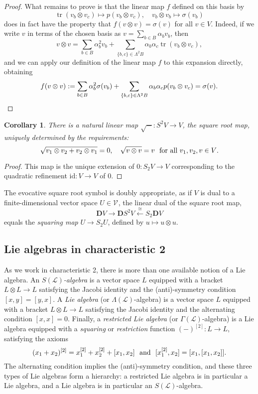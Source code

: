 \documentclass[11pt]{amsart} \renewcommand{\baselinestretch}{1.2}
\theoremstyle{plain}
\newtheorem{cor}[thm]{Corollary}
\numberwithin{equation}{section} %
\theoremstyle{plain}
\newtheorem{cor}[thm]{Corollary}
\numberwithin{equation}{chapter} %
\DeclareMathOperator{\trace}{tr}
\newcommand{\DASH}{\mathrm{-}}
\renewcommand{\to}{\longrightarrow}
\newcommand{\from}{\longleftarrow}
\newcommand{\scrL}{\mathscr{L}}
\newcommand{\calV}{\mathcal{V}}
\newcommand{\LieOperad}{{\scrL}}
\newcommand{\restn}[1]{#1^{[2]}}
\newcommand{\vect}[2]{\calV^{#1}_{#2}}
\newcommand{\Id}{\mathrm{id}}
\newcommand{\dual}{\mathbf{D}}
\renewcommand{\mapsto}{\longmapsto}
\newcommand{\SubsectionOrSection}[1]{\subsection{#1}}
\begin{document}
\begin{Conventions and notation}
\begin{proof}
What remains to prove is that the linear map $f$ defined on this basis by
\[\trace(v_b\otimes v_c)\mapsto p(v_b\otimes v_c),\quad v_b\otimes v_b\mapsto \sigma(v_b)\]
does in fact have the property that $f(v\otimes v)=\sigma(v)$ for \textup{all} $v\in V$. Indeed, if we write $v$ in terms of the chosen basis as $v=\sum_{b\in B}\alpha_bv_b$, then
\[v\otimes v
=
\sum_{b\in B}\alpha_b^2v_b+\sum_{\{b,c\}\in \Lambda^2B}\alpha_b\alpha_c\trace(v_b\otimes v_c),\]
and we can apply our definition of the linear map $f$ to this expansion directly, obtaining
\[f(v\otimes v):=
\sum_{b\in B}\alpha_b^2\sigma(v_b)+\sum_{\{b,c\}\in \Lambda^2B}\alpha_b\alpha_cp(v_b\otimes v_c)=\sigma(v).\qedhere\]
\end{proof}
\begin{cor}
There is a natural linear map $\sqrt{\DASH}:S^2V\to V$, the \emph{square root map}, uniquely determined by the requirements:
\[\sqrt{v_1\otimes v_2+v_2\otimes v_1}=0,\ \ \ \sqrt{v\otimes v}=v \textup{ \ for all $v_1,v_2,v\in V$}.\]
\end{cor}
\begin{proof}
This map is the unique extension of $0:S_2V\to V$ corresponding to the quadratic refinement $\Id:V\to V$ of $0$.
\end{proof}
\noindent The evocative square root symbol is doubly appropriate, as if $V$ is dual to a finite-dimensional vector space $U\in\vect{}{}$, the linear dual of the square root map,
\[\dual V\to \dual S^2V\overset{\cong }{\from}S_2\dual V\]
equals the \emph{squaring map} $U\to S_2U$, defined by $u\mapsto u\otimes u$.


\SubsectionOrSection{Lie algebras in characteristic 2}
\label{introtoLiealgssection}
As we work in characteristic 2, there is more than one available notion of a Lie algebra. An \emph{$S(\LieOperad)$-algebra} is a vector space $L$ equipped with a bracket $L\otimes L\to L$ satisfying the Jacobi identity and the (anti)-symmetry condition $[x,y]=[y,x]$. A \emph{Lie algebra} (or $\Lambda(\LieOperad)$-algebra) is a vector space $L$ equipped with a bracket $L\otimes L\to L$ satisfying the Jacobi identity and the alternating condition $[x,x]=0$. Finally, a \emph{restricted Lie algebra} \cite{CurtisSimplicialHtpy.pdf,6Author.pdf} (or $\Gamma(\LieOperad)$-algebra) is a Lie algebra equipped with a \emph{squaring} or \emph{restriction} function $\restn{(\DASH)}:L\to L$, satisfying the axioms
\[\restn{(x_1+x_2)}=\restn{x_1}+\restn{x_2}+[x_1,x_2]\textup{ \ and \ }[\restn{x_1},x_2]=[x_1,[x_1,x_2]].\]
The alternating condition implies the (anti)-symmetry condition, and these three types of Lie algebras form a hierarchy: a restricted Lie algebra is in particular a Lie algebra, and a Lie algebra is in particular an $S(\LieOperad)$-algebra.


\end{Conventions and notation}
\end{document}

